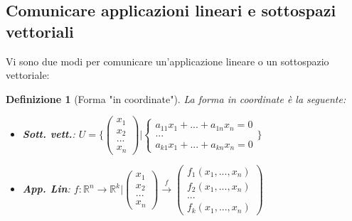 \documentclass[12pt]{article}
\newenvironment{para}{\begin{adjustwidth}{13mm}{}}{\end{adjustwidth}}
\newtheorem{Definizione}{Definizione}[subsection]
\begin{document}
\begin{para}
\subsection{Comunicare applicazioni lineari e sottospazi vettoriali}
Vi sono due modi per comunicare un'applicazione lineare o un sottospazio vettoriale:
\begin{Definizione}[Forma "in coordinate"]
La forma in coordinate è la seguente:
\begin{itemize}
    \item \textbf{Sott. vett.}: $U = \Biggl\{\begin{pmatrix}
        x_1 \\
        x_2 \\
        ... \\
        x_n
    \end{pmatrix} | \begin{cases}
        a_{11}x_1 + ... + a_{1n}x_n = 0 \\
        ... \\
        a_{k1}x_1 + ... + a_{kn}x_n = 0
    \end{cases}\Biggr\}$
    \item \textbf{App. Lin}: $f:\mathbb{R}^n \rightarrow \mathbb{R}^k | \begin{pmatrix}
        x_1 \\
        x_2 \\
        ... \\
        x_n
    \end{pmatrix} \xrightarrow[]{f} \begin{pmatrix}
        f_1(x_1, ..., x_n) \\
        f_2(x_1, ..., x_n) \\
        ... \\
        f_k(x_1, ..., x_n)
    \end{pmatrix}$
\end{itemize}
\end{Definizione}


\end{para}
\end{document}
